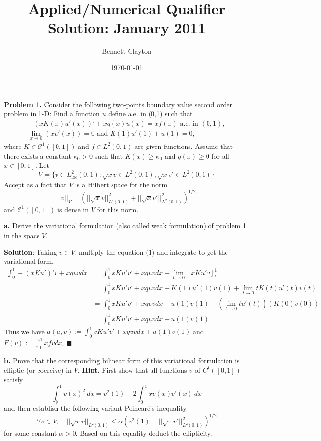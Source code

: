 \documentclass[11pt]{article}
\title{Applied/Numerical Qualifier Solution: January 2011}
\author{Bennett Clayton}
\affil{Texas A\&M University}
\date{\today}
\begin{document}
\maketitle

{\bf Problem 1.} Consider the following two-points boundary value second order problem in 1-D: Find a function $u$ define a.e. in (0,1) such that
\begin{align}
-(xK(x)u'(x))' + xq(x)u(x) = xf(x) \text{ a.e. in } (0,1), \\
\lim_{x\to 0} (xu'(x)) = 0 \text{ and } K(1)u'(1) + u(1) = 0,
\end{align}
where $K \in \mathcal{C}^1([0,1])$ and $f \in L^2(0,1)$ are given functions. Assume that there exists a constant $\kappa_0 > 0$ such that $K(x) \geq \kappa_0$ and $q(x) \geq 0$ for all $x\in [0,1]$. Let 
\[ V = \{ v\in L^2_{\text{loc}}(0,1) : \sqrt{x}v\in L^2(0,1), \sqrt{x}v' \in L^2(0,1) \} \]
Accept as a fact that $V$ is a Hilbert space for the norm
\[ ||v||_V = \left( ||\sqrt{x}v||^2_{L^2(0,1)} + ||\sqrt{x}v'||^2_{L^2(0,1)} \right)^{1/2} \]
and $\mathcal{C}^1([0,1])$ is dense in $V$ for this norm. 

\vskip 1cm

{\bf a.} Derive the variational formulation (also called weak formulation) of problem 1 in the space $V$. 

\vskip 1cm

{\bf Solution}: Taking $v \in V$, multiply the equation (1) and integrate to get the variational form. 
\begin{align*}
\int_0^1 -(xKu')'v + xquv dx &= \int_0^1 xKu'v' + xquv dx - \lim_{t\to 0}\left[xKu'v \right]_t^1 \\
&= \int_0^1 xKu'v' + xquv dx - K(1)u'(1)v(1) + \lim_{t\to 0} tK(t)u'(t)v(t) \\
&= \int_0^1 xKu'v' + xquv dx + u(1)v(1) + (\lim_{t\to 0} tu'(t))(K(0)v(0)) \\
&= \int_0^1 xKu'v' + xquv dx + u(1)v(1) 
\end{align*}
Thus we have $a(u,v) := \int_0^1 xKu'v' + xquv dx + u(1)v(1)$ and $F(v) := \int_0^1 xfv dx$. $\blacksquare$

\vskip 2cm



{\bf b.} Prove that the corresponding bilinear form of this variational formulation is elliptic (or coercive) in $V$. 
{\bf Hint.} First show that all functions $v$ of $C^1([0,1])$ satisfy 
\begin{equation}
    \int_0^1 v(x)^2 \: dx = v^2(1) - 2\int_0^1 xv(x)v'(x) \: dx   
\end{equation}
and then establish the following variant Poincaré's inequality 
\begin{equation}
    \forall v\in V, \quad  ||\sqrt{x}v||_{L^2(0,1)} \leq \alpha \left( v^2(1) + ||\sqrt{x}v'||^2_{L^2(0,1)} \right)^{1/2}   
\end{equation}
for some constant $\alpha > 0$. Based on this equality deduct the ellipticity.
\end{document}
